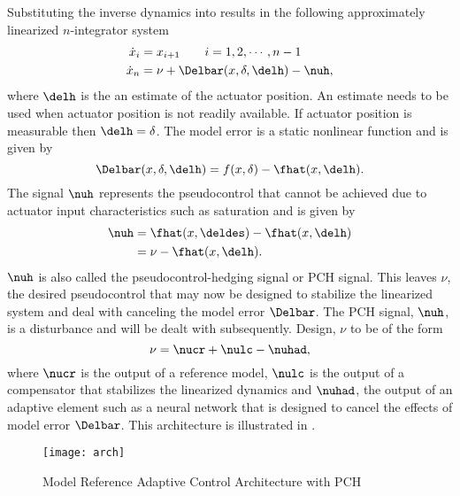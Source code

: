 Substituting the inverse dynamics  into
 results in the following approximately linearized
$n$-integrator system %
\begin{equation}\label{e:simple:xdot}
\begin{split}
\dot{x}_{i} &= x_{i+1}\qquad i = 1,2,\cdots,n-1\\
 \dot{x}_n &= \nu + \Delbar(x,\delta,\delh) - \nuh,
\end{split}
\end{equation}
where $\delh$ is the an estimate of the actuator position. An
estimate needs to be used when actuator position is not readily
available. If actuator position is measurable then $\delh = \delta$.
The model error is a static nonlinear function and is given by
\[
\Delbar(x,\delta,\delh) = f(x,\delta) - \fhat(x,\delh).
\]
The signal $\nuh$ represents the pseudocontrol that cannot be
achieved due to actuator input characteristics such as saturation and
is given by
\[
\begin{split}
\nuh &= \fhat(x,\deldes) - \fhat(x,\delh) \\
&= \nu - \fhat(x,\delh).
\end{split}
\]
$\nuh$ is also called the pseudocontrol-hedging signal or PCH
signal. This leaves $\nu$, the desired pseudocontrol that may now be
designed to stabilize the linearized system and deal with canceling
the model error $\Delbar$.  The PCH signal, $\nuh$, is a disturbance
and will be dealt with subsequently. Design, $\nu$ to be of the form
\begin{equation}\label{e:simple:nu}
\nu = \nucr + \nulc - \nuhad,
\end{equation}
where $\nucr$ is the output of a reference model, $\nulc$ is the
output of a compensator that stabilizes the linearized dynamics and
$\nuhad$, the output of an adaptive element such as a neural network
that is designed to cancel the effects of model error $\Delbar$.
This architecture is illustrated in .
\begin{figure}
  \centering\texttt{[image: arch]}
  \caption{Model Reference Adaptive Control Architecture with PCH}
  \label{f:mracWithPCH}
\end{figure}
%
